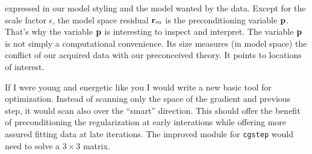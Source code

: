 expressed in our model styling
and the model wanted by the data.
Except for the scale factor $\epsilon$,
the model space residual $\bold r_m$ is the preconditioning variable $\bold p$.
That's why the variable $\bold p$ is interesting to inspect and interpret.
The variable $\bold p$ is not simply a computational convenience.
Its size measures (in model space)
the conflict of our acquired data with our preconceived theory.
It points to locations of interest.
\par
{}

\par
If I were young and energetic like you
I would write a new basic tool for optimization.
Instead of scanning only the space of the gradient and previous step,
it would scan also over the ``smart'' direction.  
This should offer the benefit of preconditioning
the regularization at early interations
while offering more assured fitting data at late iterations.
The improved 
module for \texttt{cgstep}
would need to solve a $3\times 3$ matrix.



